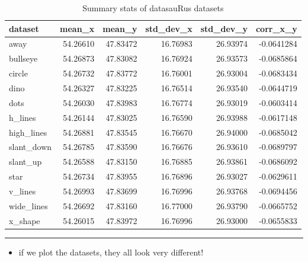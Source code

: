\documentclass[
  letterpaper,
  DIV=11]{scrartcl}
\providecommand{\tightlist}{%
  \setlength{\itemsep}{0pt}\setlength{\parskip}{0pt}}\usepackage{longtable,booktabs,array}
\begin{document}
\hypertarget{tbl-datasauRus}{}
\begin{table}
\caption{\label{tbl-datasauRus}Summary stats of datasauRus datasets }\tabularnewline

\centering\begingroup\fontsize{20}{22}\selectfont

\begin{tabular}{l|r|r|r|r|r}
\hline
dataset & mean\_x & mean\_y & std\_dev\_x & std\_dev\_y & corr\_x\_y\\
\hline
away & 54.26610 & 47.83472 & 16.76983 & 26.93974 & -0.0641284\\
\hline
bullseye & 54.26873 & 47.83082 & 16.76924 & 26.93573 & -0.0685864\\
\hline
circle & 54.26732 & 47.83772 & 16.76001 & 26.93004 & -0.0683434\\
\hline
dino & 54.26327 & 47.83225 & 16.76514 & 26.93540 & -0.0644719\\
\hline
dots & 54.26030 & 47.83983 & 16.76774 & 26.93019 & -0.0603414\\
\hline
h\_lines & 54.26144 & 47.83025 & 16.76590 & 26.93988 & -0.0617148\\
\hline
high\_lines & 54.26881 & 47.83545 & 16.76670 & 26.94000 & -0.0685042\\
\hline
slant\_down & 54.26785 & 47.83590 & 16.76676 & 26.93610 & -0.0689797\\
\hline
slant\_up & 54.26588 & 47.83150 & 16.76885 & 26.93861 & -0.0686092\\
\hline
star & 54.26734 & 47.83955 & 16.76896 & 26.93027 & -0.0629611\\
\hline
v\_lines & 54.26993 & 47.83699 & 16.76996 & 26.93768 & -0.0694456\\
\hline
wide\_lines & 54.26692 & 47.83160 & 16.77000 & 26.93790 & -0.0665752\\
\hline
x\_shape & 54.26015 & 47.83972 & 16.76996 & 26.93000 & -0.0655833\\
\hline
\end{tabular}
\endgroup{}
\end{table}

\begin{center}\rule{0.5\linewidth}{0.5pt}\end{center}

\begin{itemize}
\tightlist
\item
  if we plot the datasets, they all look very different!
\end{itemize}
\end{document}
